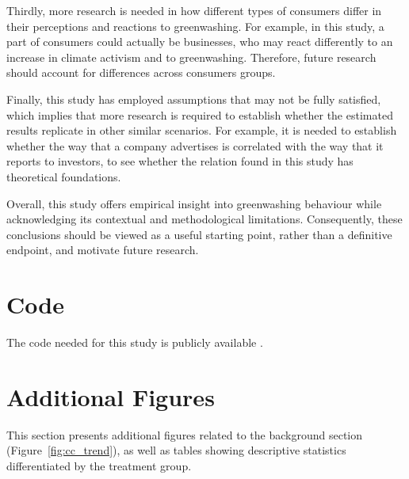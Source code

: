 \documentclass[12pt]{article}
\begin{document}
Thirdly, more research is needed in how different types of consumers differ in their perceptions and reactions to greenwashing. For example, in this study, a part of consumers could actually be businesses, who may react differently to an increase in climate activism and to greenwashing. Therefore, future research should account for differences across consumers groups. 

Finally, this study has employed assumptions that may not be fully satisfied, which implies that more research is required to establish whether the estimated results replicate in other similar scenarios. For example, it is needed to establish whether the way that a company advertises is correlated with the way that it reports to investors, to see whether the relation found in this study has theoretical foundations. 

Overall, this study offers empirical insight into greenwashing behaviour while acknowledging its contextual and methodological limitations. Consequently, these conclusions should be viewed as a useful starting point, rather than a definitive endpoint, and motivate future research.



\pagebreak
\printbibliography{}
\pagebreak
\appendix

\section{Code}

The code needed for this study is publicly available \href{https://github.com/pszewi/thesis}{}.

\renewcommand\thetable{\thesection.\arabic{table}}
\renewcommand\thefigure{\thesection.\arabic{figure}}
\setcounter{table}{0}
\setcounter{figure}{0}

\section{Additional Figures}\label{app:extra_figs}



This section presents additional figures related to the background section (Figure~\ref{fig:cc_trend}), as well as tables showing descriptive statistics differentiated by the treatment group.
\end{document}
